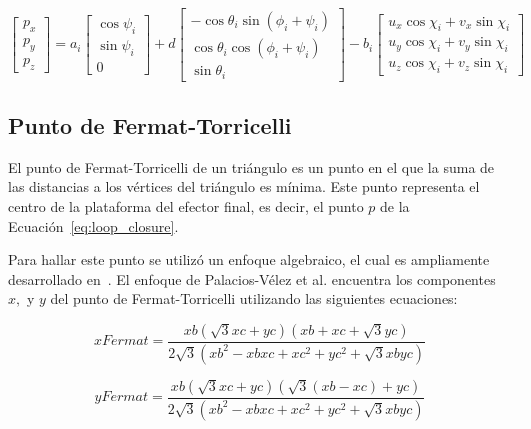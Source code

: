 \documentclass[titlepage, letterpaper, fleqn]{article}
\begin{document}
\begin{equation}
    \label{eq:loop_closure_sust}
    \begin{bmatrix}
    p_x \\
    p_y \\
    p_z
    \end{bmatrix}
    =a_i
    \begin{bmatrix}
    \cos\psi_i \\
    \sin\psi_i \\
    0
    \end{bmatrix}
    +d
    \begin{bmatrix}
    -\cos \theta_i \sin(\phi_i + \psi_i) \\
    \cos \theta_i \cos(\phi_i + \psi_i) \\
    \sin \theta_i
    \end{bmatrix}
    -b_i
    \begin{bmatrix}
    u_x \cos\chi_i + v_x \sin\chi_i \\
    u_y \cos\chi_i + v_y \sin\chi_i \\
    u_z \cos\chi_i + v_z \sin\chi_i
    \end{bmatrix}
\end{equation}

\subsection{Punto de Fermat-Torricelli}
\label{subsec:fermat-torricelli}

El punto de Fermat-Torricelli de un triángulo es un punto en el que la suma de las distancias a los vértices del triángulo es mínima.
Este punto representa el centro de la plataforma del efector final, es decir, el punto $p$ de la Ecuación~\ref{eq:loop_closure}.

Para hallar este punto se utilizó un enfoque algebraico, el cual es ampliamente desarrollado en~\cite{Palacios-Velez2015}.
El enfoque de Palacios-Vélez et al. encuentra los componentes $x,$ y $ y$ del punto de Fermat-Torricelli utilizando las siguientes ecuaciones:

\begin{equation}
    \label{eq:fermat_x}
    xFermat = \frac{xb(\sqrt{3}xc + yc)(xb + xc + \sqrt{3} yc)}{2\sqrt{3}(xb^2 - xb xc + xc^2 + yc^2 + \sqrt{3} xb yc)}
\end{equation}

\begin{equation}
    \label{eq:fermat_y}
    yFermat = \frac{xb(\sqrt{3}xc + yc)(\sqrt{3}(xb - xc) + yc)}{2\sqrt{3}(xb^2 - xb xc + xc^2 + yc^2 + \sqrt{3} xb yc)}
\end{equation}
\end{document}
